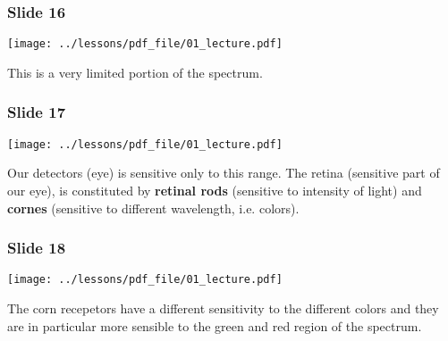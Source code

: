 \documentclass[../main/main.tex]{subfiles}
\begin{document}
\subsubsection*{Slide 16}

\begin{minipage}[]{0.5\linewidth}
\centering
\texttt{[image: ../lessons/pdf\_file/01\_lecture.pdf]}
\end{minipage}
\hspace{0.3cm}\vspace{0.3cm}
\begin{minipage}[c]{0.47\linewidth}
This is a very limited portion of the spectrum.
\end{minipage}

\subsubsection*{Slide 17}

\begin{minipage}[]{0.5\linewidth}
\centering
\texttt{[image: ../lessons/pdf\_file/01\_lecture.pdf]}
\end{minipage}
\hspace{0.3cm}\vspace{0.3cm}
\begin{minipage}[c]{0.47\linewidth}
Our detectors (eye) is sensitive only to this range. The retina (sensitive part of our eye), is constituted by \textbf{retinal rods} (sensitive to intensity of light) and \textbf{cornes} (sensitive to different wavelength, i.e. colors).
\end{minipage}

\subsubsection*{Slide 18}

\begin{minipage}[]{0.5\linewidth}
\centering
\texttt{[image: ../lessons/pdf\_file/01\_lecture.pdf]}
\end{minipage}
\hspace{0.3cm}\vspace{0.3cm}
\begin{minipage}[c]{0.47\linewidth}
The corn recepetors have a different sensitivity to the different colors and they are in particular more sensible to the green and red region of the spectrum.
\end{minipage}
\end{document}

